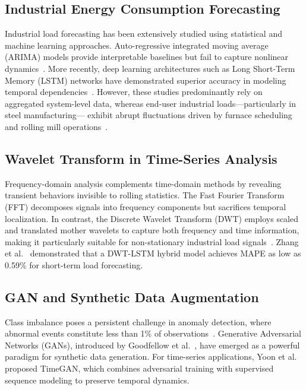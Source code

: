 \documentclass[conference]{IEEEtran}
\begin{document}
\subsection{Industrial Energy Consumption Forecasting}

Industrial load forecasting has been extensively studied using 
statistical and machine learning approaches. Auto-regressive 
integrated moving average (ARIMA) models provide interpretable 
baselines but fail to capture nonlinear dynamics~\cite{hippert2001}. 
More recently, deep learning architectures such as Long Short-Term 
Memory (LSTM) networks have demonstrated superior accuracy in 
modeling temporal dependencies~\cite{bouktif2020}. However, these 
studies predominantly rely on aggregated system-level data, whereas 
end-user industrial loads---particularly in steel manufacturing---
exhibit abrupt fluctuations driven by furnace scheduling and 
rolling mill operations~\cite{khuntia2016}.

\subsection{Wavelet Transform in Time-Series Analysis}

Frequency-domain analysis complements time-domain methods by 
revealing transient behaviors invisible to rolling statistics. 
The Fast Fourier Transform (FFT) decomposes signals into 
frequency components but sacrifices temporal localization. 
In contrast, the Discrete Wavelet Transform (DWT) employs 
scaled and translated mother wavelets to capture both frequency 
and time information, making it particularly suitable for 
non-stationary industrial load signals~\cite{mallat1989}. 
Zhang et al.~\cite{zhang2024} demonstrated that a DWT-LSTM 
hybrid model achieves MAPE as low as 0.59\% for short-term 
load forecasting.

\subsection{GAN and Synthetic Data Augmentation}

Class imbalance poses a persistent challenge in anomaly 
detection, where abnormal events constitute less than 1\% of 
observations~\cite{chandola2009}. Generative Adversarial Networks 
(GANs), introduced by Goodfellow et al.~\cite{goodfellow2014}, 
have emerged as a powerful paradigm for synthetic data generation. 
For time-series applications, Yoon et al.~\cite{yoon2019} proposed 
TimeGAN, which combines adversarial training with supervised 
sequence modeling to preserve temporal dynamics.
\end{document}

